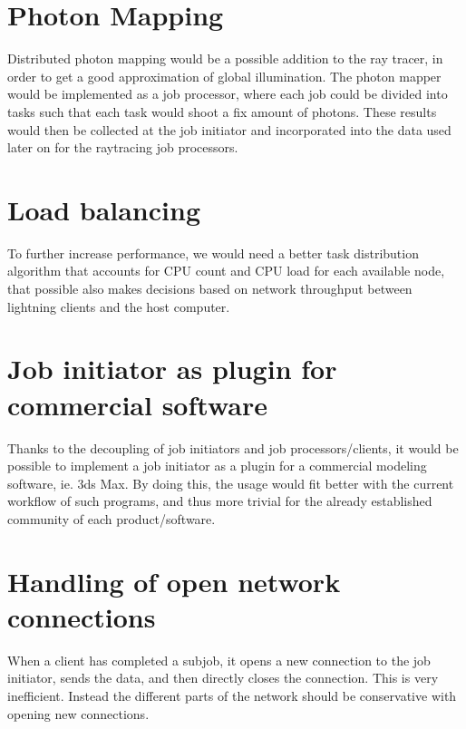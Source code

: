 
\section{Photon Mapping}
Distributed photon mapping would be a possible addition to the ray tracer, in order to get a good approximation of global illumination. The photon mapper would be implemented as a job processor, where each job could be divided into tasks such that each task would shoot a fix amount of photons. These results would then be collected at the job initiator and incorporated into the data used later on for the raytracing job processors. 

\section{Load balancing}
To further increase performance, we would need a better task distribution algorithm that accounts for CPU count and CPU load for each available node, that possible also makes decisions based on network throughput between lightning clients and the host computer.

\section{Job initiator as plugin for commercial software}
Thanks to the decoupling of job initiators and job processors/clients, it would be possible to implement a job initiator as a plugin for a commercial modeling software, ie. 3ds Max. By doing this, the usage would fit better with the current workflow of such programs, and thus more trivial for the already established community of each product/software.

\section{Handling of open network connections}
When a client has completed a subjob, it opens a new connection to the job initiator, sends the data, and then directly closes the connection.
This is very inefficient. Instead the different parts of the network should be conservative with opening new connections.

